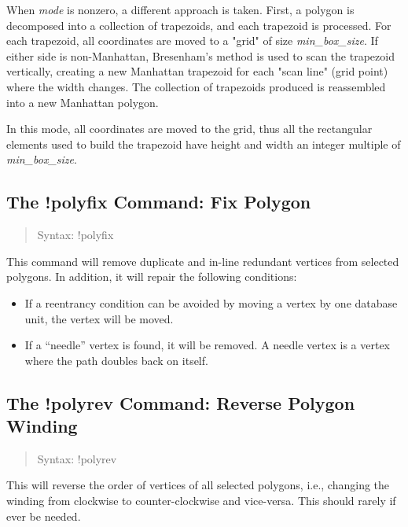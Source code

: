When {\it mode} is nonzero, a different approach is taken.  First, a
polygon is decomposed into a collection of trapezoids, and each
trapezoid is processed.  For each trapezoid, all coordinates are moved
to a "grid" of size {\it min\_box\_size}.  If either side is
non-Manhattan, Bresenham's method is used to scan the trapezoid
vertically, creating a new Manhattan trapezoid for each "scan line"
(grid point) where the width changes.  The collection of trapezoids
produced is reassembled into a new Manhattan polygon.

In this mode, all coordinates are moved to the grid, thus all the
rectangular elements used to build the trapezoid have height and width
an integer multiple of {\it min\_box\_size}.

\subsection{The {\cb !polyfix} Command: Fix Polygon}
\begin{quote}
Syntax: {\vt !polyfix}
\end{quote}
This command will remove duplicate and in-line redundant vertices from
selected polygons.  In addition, it will repair the following
conditions:

\begin{itemize}
\item{If a reentrancy condition can be avoided by moving a vertex by
 one database unit, the vertex will be moved.}
\item{If a ``needle'' vertex is found, it will be removed.  A needle
 vertex is a vertex where the path doubles back on itself.}
\end{itemize}

\subsection{The {\cb !polyrev} Command: Reverse Polygon Winding}
\begin{quote}
Syntax: {\vt !polyrev}
\end{quote}
This will reverse the order of vertices of all selected polygons,
i.e., changing the winding from clockwise to counter-clockwise and
vice-versa.  This should rarely if ever be needed.

